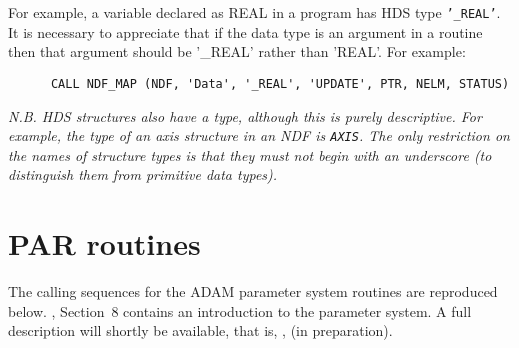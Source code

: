 For example, a variable declared as REAL in a program has HDS type 
{\tt '\_REAL'}.
It is necessary to appreciate that if the data type is 
an argument in a 
routine then that  argument should be '\_REAL' rather than 'REAL'.
For example:
\begin{verbatim}
      CALL NDF_MAP (NDF, 'Data', '_REAL', 'UPDATE', PTR, NELM, STATUS)
\end{verbatim}

{\sl N.B. HDS structures also have a type, although this is purely descriptive.
For example, the type of an axis  structure in an NDF is {\tt AXIS}.
The only restriction on the names of structure types is that they 
must not begin with an underscore (to distinguish them from 
primitive data types).}

\newpage
\section{PAR routines\label{apxpar}}

The calling sequences for the ADAM  parameter system routines are
reproduced below. , Section~8  contains an introduction to
the parameter system.
A full description will shortly be available, that is,
, (in preparation).

